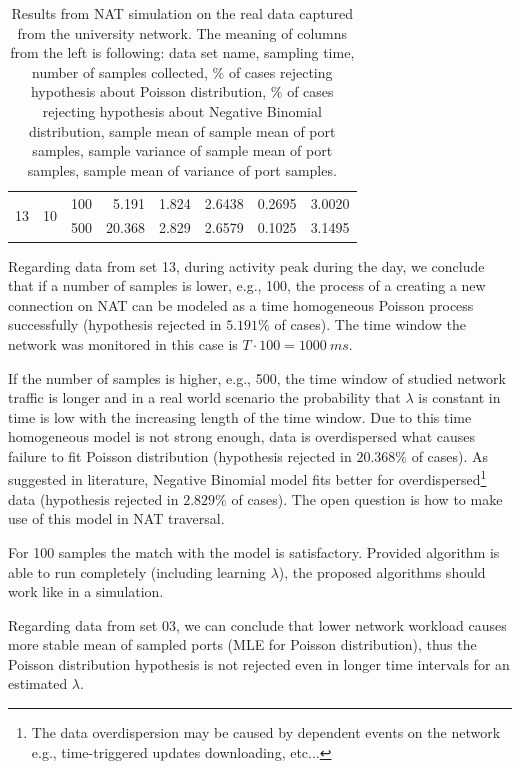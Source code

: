 \documentclass[twoside]{article}
\begin{document}
\begin{multicols}{2}
\begin{table}[t]
\begin{tabular}{| l | r | r | r | r | r | r | r |}
    \multirow{2}{*}{13}  & \multirow{2}{*}{10}     & 100     & 5.191      & 1.824     & 2.6438       &  0.2695    & 3.0020 \\ \cline{3-8}
      &      & 500     & 20.368     & 2.829     & 2.6579       &  0.1025                    & 3.1495 \\ \hline
  \end{tabular}
  \caption{Results from NAT simulation on the real data captured from the university network. 
    The meaning of columns from the left is following: data set name, sampling time, number of samples collected,
    \% of cases rejecting hypothesis about Poisson distribution,  
    \% of cases rejecting hypothesis about Negative Binomial distribution,
    sample mean of sample mean of port samples,
    sample variance of sample mean of port samples,
    sample mean of variance of port samples.}
  \label{tab:1}
\end{table}

Regarding data from set 13, during activity peak during the day, we conclude that if a number of samples 
is lower, e.g., 100, the process of a creating a new connection on NAT can 
be modeled as a time homogeneous Poisson process successfully (hypothesis rejected in $5.191\%$ of cases).
The time window the network was monitored in this case is $T \cdot 100 = 1000~ms$. 

If the number of samples is higher, e.g., 500, the time window of studied network traffic is longer and
in a real world scenario the probability that $\lambda$ is constant in time is low with the increasing length of the time
window. Due to this time homogeneous model is not strong enough, data is 
overdispersed what causes failure to fit Poisson distribution (hypothesis rejected in $20.368\%$ of cases). As suggested
in literature, Negative Binomial model fits better for overdispersed\footnote{The data overdispersion may be caused by dependent events on the network e.g., time-triggered updates downloading, etc...}
data (hypothesis rejected in $2.829\%$ of cases). 
The open question is how to make use of this model in NAT traversal.

For 100 samples the match with the model is satisfactory. Provided algorithm is able to run completely (including learning $\lambda$),
the proposed algorithms should work like in a simulation.

Regarding data from set 03, we can conclude that lower network workload causes more stable mean of sampled ports (MLE for Poisson distribution),
thus the Poisson distribution hypothesis is not rejected even in longer time intervals for an estimated $\lambda$. 



\end{multicols}
\end{document}
